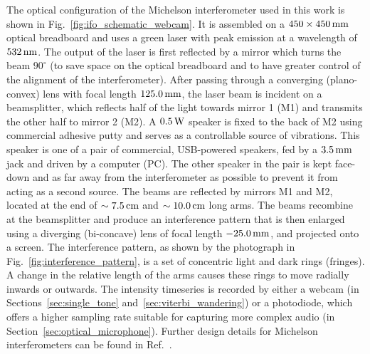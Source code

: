 \documentclass[paper-main.tex]{subfiles}
\begin{document}
The optical configuration of the Michelson interferometer used in this work is shown in Fig.~\ref{fig:ifo_schematic_webcam}.
It is assembled on a $450 \times 450 \,{\rm mm} $ optical breadboard and uses a green laser with peak emission at a wavelength of $532\,{\rm nm}$.
The output of the laser is first reflected by a mirror which turns the beam $90^{\circ}$ (to save space on the optical breadboard and to have greater control of the alignment of the interferometer).
After passing through a converging (plano-convex) lens with focal length $125.0\,{\rm mm}$, the laser beam is incident on a beamsplitter, which reflects half of the light towards mirror 1 (M1) and transmits the other half to mirror 2 (M2). 
A $0.5\,{\rm W}$ speaker is fixed to the back of M2 using commercial adhesive putty and serves as a controllable source of vibrations. 
This speaker is one of a pair of commercial, USB-powered speakers, fed by a $3.5\,{\rm mm}$ jack and driven by a computer (PC). 
The other speaker in the pair is kept face-down and as far away from the interferometer as possible to prevent it from acting as a second source.
The beams are reflected by mirrors M1 and M2, located at the end of $\sim 7.5\,{\rm cm}$ and $\sim 10.0\,{\rm cm}$ long arms.
The beams recombine at the beamsplitter and produce an interference pattern that is then enlarged using a diverging (bi-concave) lens of focal length $-25.0\,{\rm mm}$, and projected onto a screen.
The interference pattern, as shown by the photograph in Fig.~\ref{fig:interference_pattern}, is a set of concentric light and dark rings (fringes). 
A change in the relative length of the arms causes these rings to move radially inwards or outwards.
The intensity timeseries is recorded by either a webcam (in Sections~\ref{sec:single_tone} and~\ref{sec:viterbi_wandering}) or a photodiode, which offers a higher sampling rate suitable for capturing more complex audio (in Section~\ref{sec:optical_microphone}).
Further design details for Michelson interferometers can be found in Ref.~\cite{TTExhibit:2021}.
\end{document}
